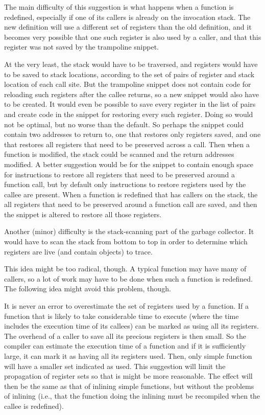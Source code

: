 The main difficulty of this suggestion is what happens when a function
is redefined, especially if one of its callers is already on the
invocation stack.  The new definition will use a different set of
registers than the old definition, and it becomes very possible that
one such register is also used by a caller, and that this register was
not saved by the trampoline snippet.

At the very least, the stack would have to be traversed, and registers
would have to be saved to stack locations, according to the set of
pairs of register and stack location of each call site.  But the
trampoline snippet does not contain code for reloading such registers
after the callee returns, so a new snippet would also have to be
created.  It would even be possible to save every register in the list
of pairs and create code in the snippet for restoring every such
register.  Doing so would not be optimal, but no worse than the
default.  So perhaps the snippet could contain two addresses to return
to, one that restores only registers saved, and one that restores all
registers that need to be preserved across a call.  Then when a
function is modified, the stack could be scanned and the return
addresses modified.  A better suggestion would be for the snippet to
contain enough space for instructions to restore all registers that
need to be preserved around a function call, but by default only
instructions to restore registers used by the callee are present.
When a function is redefined that has callers on the stack, the all
registers that need to be preserved around a function call are saved,
and then the snippet is altered to restore all those registers.

Another (minor) difficulty is the stack-scanning part of the garbage
collector.  It would have to scan the stack from bottom to top in
order to determine which registers are live (and contain \commonlisp{}
objects) to trace.

This idea might be too radical, though.  A typical function may have
many of callers, so a lot of work may have to be done when such a
function is redefined.  The following idea might avoid this problem,
though.

It is never an error to overestimate the set of registers used by a
function.  If a function that is likely to take considerable time to
execute (where the time includes the execution time of its callees)
can be marked as using all its registers.  The overhead of a caller to
save all its precious registers is then small.  So the compiler can
estimate the execution time of a function and if it is sufficiently
large, it can mark it as having all its registers used.  Then, only
simple function will have a smaller set indicated as used.  This
suggestion will limit the propagation of register sets so that is
might be more reasonable.  The effect will then be the same as that of
inlining simple functions, but without the problems of inlining (i.e.,
that the function doing the inlining must be recompiled when the
callee is redefined).

